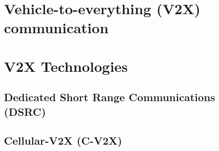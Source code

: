 



\section{Vehicle-to-everything (V2X) communication}


% 






\section{V2X Technologies}

\subsection{Dedicated Short Range Communications (DSRC)}

\subsection{Cellular-V2X (C-V2X)}

